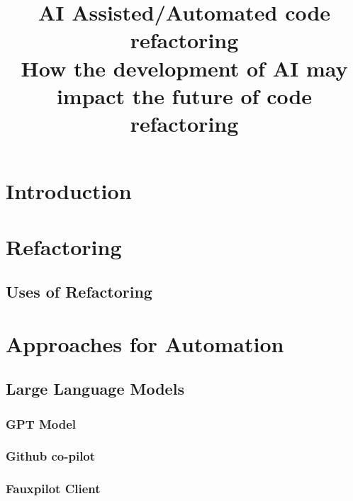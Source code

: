 \documentclass[conference]{IEEEtran}
\begin{document}
\title{AI Assisted/Automated code refactoring\\
{\footnotesize How the development of AI may impact the future of code refactoring}
}

\author{
    \and
}

\maketitle



\section{Introduction}


\section{Refactoring}
\subsection{Uses of Refactoring}


\section{Approaches for Automation}

\subsection{Large Language Models}
\subsubsection{GPT Model}
\subsubsection{Github co-pilot}
\subsubsection{Fauxpilot Client}
\end{document}
